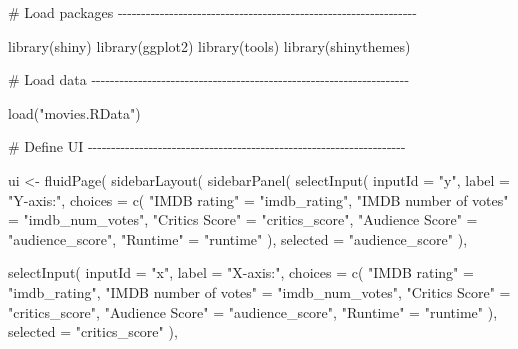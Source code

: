 \documentclass[
  letterpaper,
  DIV=11,
  numbers=noendperiod]{scrreprt}
\newenvironment{Shaded}{\begin{snugshade}}{\end{snugshade}}
\newcommand{\AttributeTok}[1]{\textcolor[rgb]{0.40,0.46,0.14}{#1}}
\newcommand{\CommentTok}[1]{\textcolor[rgb]{0.37,0.37,0.37}{#1}}
\newcommand{\FunctionTok}[1]{\textcolor[rgb]{0.28,0.35,0.67}{#1}}
\newcommand{\NormalTok}[1]{\textcolor[rgb]{0.00,0.46,0.62}{#1}}
\newcommand{\OtherTok}[1]{\textcolor[rgb]{0.00,0.46,0.62}{#1}}
\newcommand{\StringTok}[1]{\textcolor[rgb]{0.13,0.47,0.30}{#1}}
\begin{document}
\begin{Shaded}
\begin{Highlighting}[]
\CommentTok{\# Load packages {-}{-}{-}{-}{-}{-}{-}{-}{-}{-}{-}{-}{-}{-}{-}{-}{-}{-}{-}{-}{-}{-}{-}{-}{-}{-}{-}{-}{-}{-}{-}{-}{-}{-}{-}{-}{-}{-}{-}{-}{-}{-}{-}{-}{-}{-}{-}{-}{-}{-}{-}{-}{-}{-}{-}{-}{-}{-}{-}{-}{-}{-}{-}{-}}

\FunctionTok{library}\NormalTok{(shiny)}
\FunctionTok{library}\NormalTok{(ggplot2)}
\FunctionTok{library}\NormalTok{(tools)}
\FunctionTok{library}\NormalTok{(shinythemes)}

\CommentTok{\# Load data {-}{-}{-}{-}{-}{-}{-}{-}{-}{-}{-}{-}{-}{-}{-}{-}{-}{-}{-}{-}{-}{-}{-}{-}{-}{-}{-}{-}{-}{-}{-}{-}{-}{-}{-}{-}{-}{-}{-}{-}{-}{-}{-}{-}{-}{-}{-}{-}{-}{-}{-}{-}{-}{-}{-}{-}{-}{-}{-}{-}{-}{-}{-}{-}{-}{-}{-}{-}}

\FunctionTok{load}\NormalTok{(}\StringTok{"movies.RData"}\NormalTok{)}

\CommentTok{\# Define UI {-}{-}{-}{-}{-}{-}{-}{-}{-}{-}{-}{-}{-}{-}{-}{-}{-}{-}{-}{-}{-}{-}{-}{-}{-}{-}{-}{-}{-}{-}{-}{-}{-}{-}{-}{-}{-}{-}{-}{-}{-}{-}{-}{-}{-}{-}{-}{-}{-}{-}{-}{-}{-}{-}{-}{-}{-}{-}{-}{-}{-}{-}{-}{-}{-}{-}{-}{-}}

\NormalTok{ui }\OtherTok{\textless{}{-}} \FunctionTok{fluidPage}\NormalTok{(}
  \FunctionTok{sidebarLayout}\NormalTok{(}
    \FunctionTok{sidebarPanel}\NormalTok{(}
      \FunctionTok{selectInput}\NormalTok{(}
        \AttributeTok{inputId =} \StringTok{"y"}\NormalTok{,}
        \AttributeTok{label =} \StringTok{"Y{-}axis:"}\NormalTok{,}
        \AttributeTok{choices =} \FunctionTok{c}\NormalTok{(}
          \StringTok{"IMDB rating"} \OtherTok{=} \StringTok{"imdb\_rating"}\NormalTok{,}
          \StringTok{"IMDB number of votes"} \OtherTok{=} \StringTok{"imdb\_num\_votes"}\NormalTok{,}
          \StringTok{"Critics Score"} \OtherTok{=} \StringTok{"critics\_score"}\NormalTok{,}
          \StringTok{"Audience Score"} \OtherTok{=} \StringTok{"audience\_score"}\NormalTok{,}
          \StringTok{"Runtime"} \OtherTok{=} \StringTok{"runtime"}
\NormalTok{        ),}
        \AttributeTok{selected =} \StringTok{"audience\_score"}
\NormalTok{      ),}

      \FunctionTok{selectInput}\NormalTok{(}
        \AttributeTok{inputId =} \StringTok{"x"}\NormalTok{,}
        \AttributeTok{label =} \StringTok{"X{-}axis:"}\NormalTok{,}
        \AttributeTok{choices =} \FunctionTok{c}\NormalTok{(}
          \StringTok{"IMDB rating"} \OtherTok{=} \StringTok{"imdb\_rating"}\NormalTok{,}
          \StringTok{"IMDB number of votes"} \OtherTok{=} \StringTok{"imdb\_num\_votes"}\NormalTok{,}
          \StringTok{"Critics Score"} \OtherTok{=} \StringTok{"critics\_score"}\NormalTok{,}
          \StringTok{"Audience Score"} \OtherTok{=} \StringTok{"audience\_score"}\NormalTok{,}
          \StringTok{"Runtime"} \OtherTok{=} \StringTok{"runtime"}
\NormalTok{        ),}
        \AttributeTok{selected =} \StringTok{"critics\_score"}
\NormalTok{      ),}


\end{Highlighting}
\end{Shaded}
\end{document}
